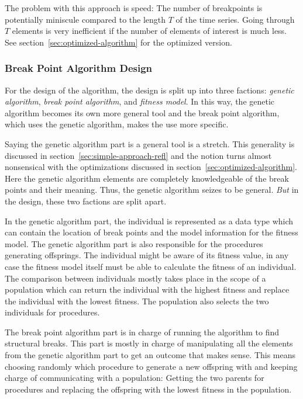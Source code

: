 The problem with this approach is speed: The number of breakpoints is potentially miniscule compared
to the length $T$ of the time series. Going through $T$ elements is very
inefficient if the number of elements of interest is much less. See
section~\ref{sec:optimized-algorithm} for the optimized version. 

\subsubsection{Break Point Algorithm Design}

For the design of the algorithm, the design is split up into three factions:
\textit{genetic algorithm}, \textit{break point algorithm}, and \textit{fitness
model}. In this way, the genetic algorithm
becomes its own more general tool and the break point algorithm, which uses the
genetic algorithm, makes the use more specific. 

Saying the genetic algorithm part is a general tool is a stretch. This
generality is discussed in section~\ref{sec:simple-approach-refl} and the notion
turns almost nonsensical with the optimizations discussed in
section~\ref{sec:optimized-algorithm}. Here the genetic algorithm elements are
completely knowledgeable of the break points and their meaning. Thus, the
genetic algorithm seizes to be general. \textit{But} in
the design, these two factions are split apart. 

In the genetic algorithm part, the individual is represented as a data type
which can contain the location of break points and the model information for the
fitness model. The genetic algorithm part is also responsible for the procedures
generating offsprings. The individual might be aware of its fitness value, in
any case the fitness model itself must be able to calculate the fitness of an
individual. The comparison between individuals mostly takes place in the scope
of a population which can return the individual with the highest fitness and
replace the individual with the lowest fitness. The population also selects the
two individuals for procedures. 

The break point algorithm part is in charge of running the algorithm to find
structural breaks. This part is mostly in charge of manipulating all the
elements from the genetic algorithm part to get an outcome that makes sense.
This means choosing randomly which procedure to generate a new offspring with
and keeping charge of communicating with a population: Getting the two parents
for procedures and replacing the offspring with the lowest fitness in the
population.  


